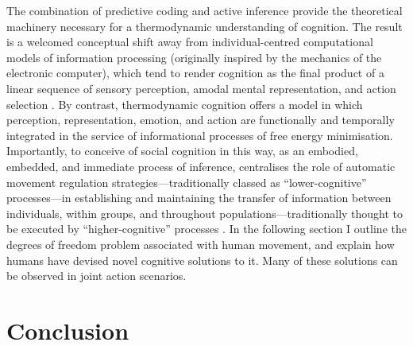 The combination of predictive coding and active inference provide the theoretical machinery necessary for a thermodynamic understanding of cognition.  The result is a welcomed conceptual shift away from individual-centred computational models of information processing (originally inspired by the mechanics of the electronic computer), which tend to render cognition as the final product of a linear sequence of sensory perception, amodal mental representation, and action selection \citep{Lewis2005}.  By contrast, thermodynamic cognition offers a model in which perception, representation, emotion, and action are functionally and temporally integrated in the service of informational processes of free energy minimisation.  Importantly,  to conceive of social cognition in this way, as an embodied, embedded, and immediate process of inference, centralises the role of automatic movement regulation strategies---traditionally classed as ``lower-cognitive'' processes---in establishing and maintaining the transfer of information between individuals, within groups, and throughout populations---traditionally thought to be executed by  ``higher-cognitive'' processes \citep{Claidiere2014}.
In the following section I outline the degrees of freedom problem associated with human movement, and explain how humans have devised novel cognitive solutions to it.  Many of these solutions can be observed in joint action scenarios.











\section{Conclusion}
